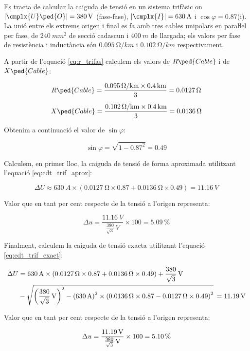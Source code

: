 \begin{exemple}\label{ex:CaigudaDeTensio}
	\addcontentsxms{\CaigudaDeTensio}
       Es tracta de calcular la caiguda de tensió en un sistema trifàsic on $|\cmplx{U}\ped{O}| = \qty{380}{V}$ (fase-fase), $|\cmplx{I}|=\qty{630}{A}$ i $\cos \varphi = \num{0,87}$(i). La unió entre els extrems origen  i final es fa amb tres cables unipolars en paraŀlel per fase, de $\qty{240}{mm^2}$ de secció cadascun i $\qty{400}{m}$ de llargada; els valors per fase de resistència i inductància són $\qty{0,095}{\ohm/km}$ i $\qty{0,102}{\ohm/km}$ respectivament.

    A partir de l'equació \eqref{eq:r_trifas} calculem els valors de $R\ped{Cable}$ i de $X\ped{Cable}$:

    \begin{gather*}
        R\ped{Cable} = \frac{\qty{0,095}{\ohm/km}\times \qty{0,4}{km}}{3} = \qty{0,0127}{\ohm}\\[2mm]
        X\ped{Cable} = \frac{\qty{0,102}{\ohm/km}\times \qty{0,4}{km}}{3} = \qty{0,0136}{\ohm}\\
    \end{gather*}

    Obtenim a continuació el valor de $\sin \varphi$:

    \[
       \sin \varphi = \sqrt{1-\num{0,87}^2} = \num{0,49}
    \]

    Calculem, en primer lloc, la caiguda de tensió de forma aproximada utilitzant l'equació \eqref{eq:cdt_trif_aprox}:

    \[
       \Delta U \approx \qty{630}{A} \times ( \qty{0,0127}{\ohm} \times \num{0,87} + \qty{0,0136}{\ohm} \times \num{0,49} ) = \qty{11,16}{V}
    \]

    Valor que en tant per cent respecte de la tensió a l'origen representa:

    \[
        \Delta u = \frac{\qty{11,16}{V}}{\frac{380}{\sqrt{3}}\unit{\,V}} \times 100 = \qty{5,09}{\percent}
    \]

    Finalment, calculem la caiguda de tensió exacta utilitzant l'equació \eqref{eq:cdt_trif_exact}:

    \[ \begin{split}
       \Delta U &=  \qty{630}{A} \times( \qty{0,0127}{\ohm} \times \num{0,87} + \qty{0,0136}{\ohm} \times \num{0,49}) + \qty[parse-numbers = false]{\frac{380}{\sqrt{3}}}{V}  \\
        &- \sqrt{\left(\qty[parse-numbers = false]{\frac{380}{\sqrt{3}}}{V}\right)^2 - \left(\qty{630}{A}\right)^2 \times  \left( \qty{0,0136}{\ohm} \times \num{0,87} - \qty{0,0127}{\ohm} \times \num{0,49} \right)^2 } \,= \qty{11,19}{V}
    \end{split} \]

    Valor que en tant per cent respecte de la tensió a l'origen representa:

    \[
        \Delta u = \frac{\qty{11,19}{V}}{\qty[parse-numbers = false]{\frac{380}{\sqrt{3}}}{V}} \times 100 = \qty{5,10}{\percent}
    \]
\end{exemple}


